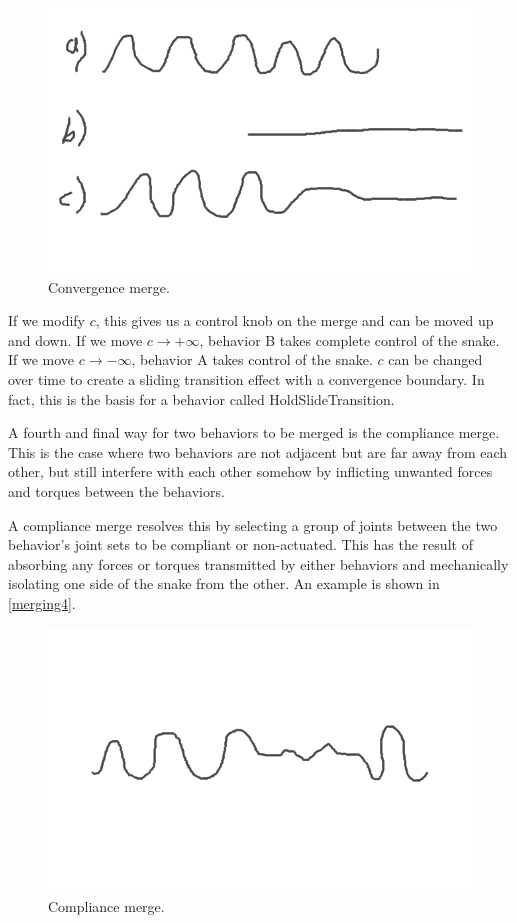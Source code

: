 \begin{figure}[htbp]
\centering
\includegraphics[keepaspectratio,width=400pt,height=0.75\textheight]{2_behaviors_3.png}
\caption{Convergence merge.}
\label{merging3}
\end{figure}



If we modify $c$, this gives us a control knob on the merge and can be moved up and down. If we move $c \to +\infty$, behavior B takes complete control of the snake. If we move $c \to -\infty$, behavior A takes control of the snake. $c$ can be changed over time to create a sliding transition effect with a convergence boundary. In fact, this is the basis for a behavior called HoldSlideTransition.

A fourth and final way for two behaviors to be merged is the compliance merge. This is the case where two behaviors are not adjacent but are far away from each other, but still interfere with each other somehow by inflicting unwanted forces and torques between the behaviors.

A compliance merge resolves this by selecting a group of joints between the two behavior's joint sets to be compliant or non-actuated. This has the result of absorbing any forces or torques transmitted by either behaviors and mechanically isolating one side of the snake from the other. An example is shown in \autoref{merging4}.

\begin{figure}[htbp]
\centering
\includegraphics[keepaspectratio,width=400pt,height=0.75\textheight]{2_behaviors_4.png}
\caption{Compliance merge.}
\label{merging4}
\end{figure}



